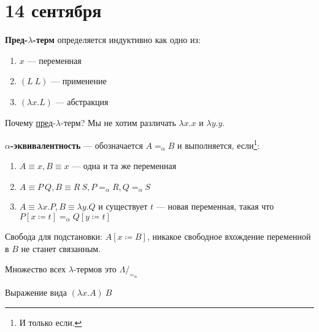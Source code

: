 \chapter{14 сентября}

\begin{definition}
    \textbf{Пред-\(\lambda\)-терм} определяется индуктивно как одно из:
    \begin{enumerate}
        \item \(x\) --- переменная
        \item \((L\ L)\) --- применение
        \item \((\lambda x.L)\) --- абстракция
    \end{enumerate}
\end{definition}

Почему \underline{пред}-\(\lambda\)-терм? Мы не хотим различать \(\lambda x.x\) и \(\lambda y.y\).

\begin{definition}
    \textbf{\(\alpha\)-эквивалентность} --- обозначается \(A =_\alpha B\) и выполняется, если\footnote{И только если.}:
    \begin{enumerate}
        \item \(A \equiv x, B \equiv x\) --- одна и та же переменная
        \item \(A \equiv P\ Q, B \equiv R\ S, P =_\alpha R, Q =_\alpha S\)
        \item \(A \equiv \lambda x.P, B \equiv \lambda y.Q\) и существует \(t\) --- новая переменная, такая что \(P[x \coloneqq t] =_\alpha Q[y \coloneqq t]\)
    \end{enumerate}
\end{definition}

\begin{definition}
    Свобода для подстановки: \(A[x \coloneqq B]\), никакое свободное вхождение переменной в \(B\) не станет связанным.
\end{definition}

\begin{definition}
    Множество всех \(\lambda\)-термов это \(\Lambda /_{ =_\alpha}\)
\end{definition}

\begin{definition}
    Выражение вида \((\lambda x.A)\ B\)
\end{definition}

